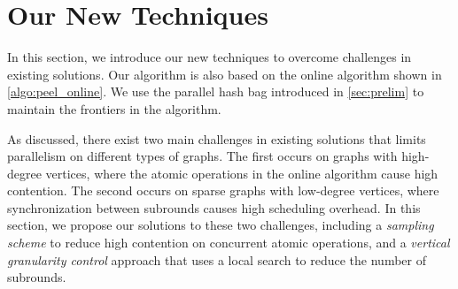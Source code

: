 \section{Our New Techniques}\label{sec:online-framework}
In this section, we introduce our new techniques to overcome challenges in existing solutions. 
Our algorithm is also based on the online algorithm shown in \cref{algo:peel_online}. 
We use the parallel hash bag introduced in \cref{sec:prelim} 
to maintain the frontiers in the algorithm. 

As discussed, there exist two main challenges in existing solutions that limits parallelism on different types of graphs.
The first occurs on graphs with high-degree vertices, 
where the atomic operations in the online algorithm cause high contention.
The second occurs on sparse graphs with low-degree vertices, where synchronization between subrounds causes high scheduling overhead. 
In this section, we propose our solutions to these two challenges, including a \emph{sampling scheme} to reduce high contention on concurrent atomic operations,
and a \emph{vertical granularity control} approach that uses a local search to reduce the number of subrounds. 



 